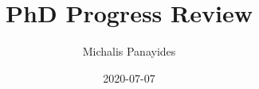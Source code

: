 \documentclass{beamer}
\title{\Large{PhD Progress Review}}
\author{Michalis Panayides}
\date{2020-07-07}
\begin{document}
\frame{\titlepage}




\end{document}
